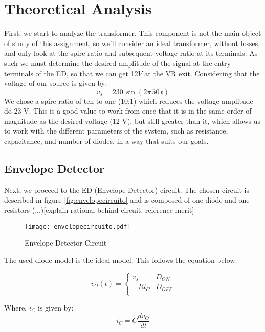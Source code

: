 \section{Theoretical Analysis}
\label{sec:theoretical}

First, we start to analyze the transformer. This component is not the main object of study of this assignment, so we'll consider an ideal transformer, without losses, and only look at the spire ratio and subsequent voltage ratio at its terminals. As such we must determine the desired amplitude of the signal at the entry terminals of the ED, so that we can get 12$V$ at the VR exit.
Considering that the voltage of our source is given by:
\begin{equation*}
v_s=230 \, \sin(2 \pi \, 50 \, t)
\end{equation*}
We chose a spire ratio of ten to one (10:1) which reduces the voltage amplitude do 23 V. This is a good value to work from once that it is in the same order of magnitude as the desired voltage (12 V), but still greater than it, which allows us to work with the different parameters of the system, such as resistance, capacitance, and number of diodes, in a way that suits our goals.

\subsection{Envelope Detector}

Next, we proceed to the ED (Envelope Detector) circuit. The chosen circuit is described in figure \ref{fig:envelopecircuito} and is composed of one diode and one resistors (...)[explain rational behind circuit, reference merit]

\begin{figure}[h]
\centering
\texttt{[image: envelopecircuito.pdf]}
\caption{Envelope Detector Circuit}
\label{fig:envelope}
\end{figure}


The used diode model is the ideal model. This follows the equation below.

\begin{equation}
	v_O(t) = \left\{
	\begin{array}{ll}
		v_s & D_{ON} \\
	 -R i_C & D_{OFF}\\
  \end{array}
\right.
\end{equation}

Where, $i_C$ is given by:
\begin{equation}
  i_C=C \frac{d v_O}{dt}
\end{equation}

